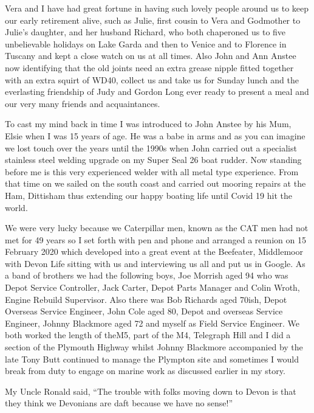 Vera and I have had great fortune in having such lovely people around us to keep
our early retirement alive, such as Julie, first cousin to Vera and Godmother
to Julie's daughter, and her husband Richard, who both chaperoned us to five
unbelievable holidays on Lake Garda and then to Venice and to Florence in
Tuscany and kept a close watch on us at all times. Also John and Ann Anstee
now identifying that the old joints need an extra grease nipple fitted together
with an extra squirt of WD40, collect us and take us for Sunday lunch and the
everlasting friendship of Judy and Gordon Long ever ready to present a meal and
our very many friends and acquaintances.

To cast my mind back in time I was introduced to John Anstee by his Mum, Elsie
when I was 15 years of age. He was a babe in arms and as you can imagine we
lost touch over the years until the 1990s when John carried out a specialist
stainless steel welding upgrade on my Super Seal 26 boat rudder. Now standing
before me is this very experienced welder with all metal type experience. From
that time on we sailed on the south coast and carried out mooring repairs at
the Ham, Dittisham thus extending our happy boating life until Covid 19 hit the
world.

We were very lucky because we Caterpillar men, known as the CAT men had not met
for 49 years so I set forth with pen and phone and arranged a reunion on 15
February 2020 which developed into a great event at the Beefeater, Middlemoor
with Devon Life sitting with us and interviewing us all and put us in Google.
As a band of brothers we had the following boys, Joe Morrish aged 94 who was
Depot Service Controller, Jack Carter, Depot Parts Manager and Colin Wroth,
Engine Rebuild Supervisor. Also there was Bob Richards aged 70ish, Depot
Overseas Service Engineer, John Cole aged 80, Depot and overseas Service
Engineer, Johnny Blackmore aged 72 and myself as Field Service Engineer. We
both worked the length of theM5, part of the M4, Telegraph Hill and I did a
section of the Plymouth Highway whilst Johnny Blackmore accompanied by the late
Tony Butt continued to manage the Plympton site and sometimes I would break
from duty to engage on marine work as discussed earlier in my story.

My Uncle Ronald said, ``The trouble with folks moving down to Devon is that they
think we Devonians are daft because we have no sense!''
